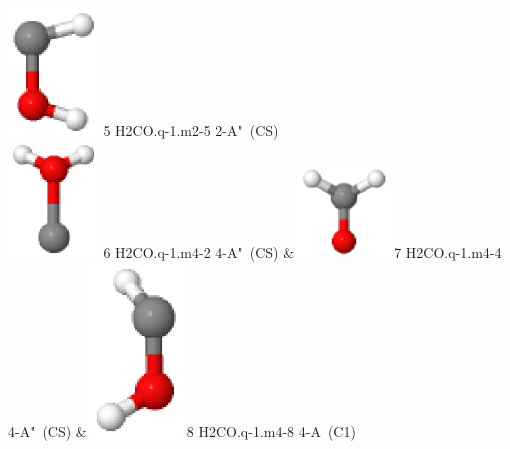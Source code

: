 \documentclass[10pt]{article}
\begin{document}
\begin{tabular}
\includegraphics[width=2.40000000000000000000cm]{H2CO.q-1.m2-5.eps} \tiny{5 \hspace{1.20000000000000000000cm} H2CO.q-1.m2-5 \hspace{5pt} 2-A"~(CS)} 
\\\hline
\includegraphics[width=2.40000000000000000000cm]{H2CO.q-1.m4-2.eps} \tiny{6 \hspace{1.20000000000000000000cm} H2CO.q-1.m4-2 \hspace{5pt} 4-A"~(CS)} &
\includegraphics[width=2.40000000000000000000cm]{H2CO.q-1.m4-4.eps} \tiny{7 \hspace{1.20000000000000000000cm} H2CO.q-1.m4-4 \hspace{5pt} 4-A"~(CS)} &
\includegraphics[width=2.40000000000000000000cm]{H2CO.q-1.m4-8.eps} \tiny{8 \hspace{1.20000000000000000000cm} H2CO.q-1.m4-8 \hspace{5pt} 4-A~(C1)} 
\\
\end{tabular}
\end{document}
